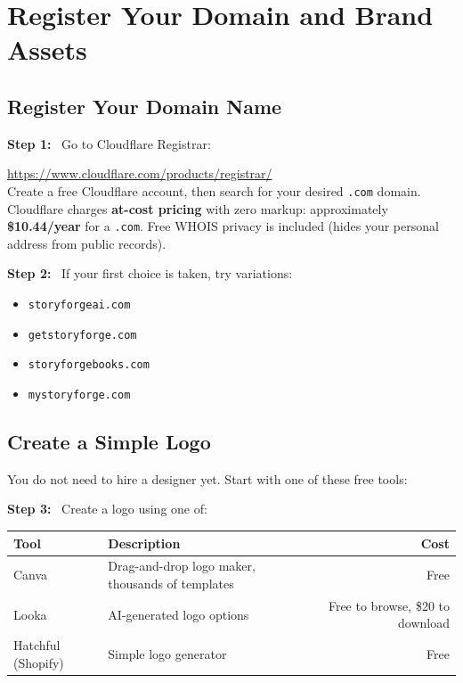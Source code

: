 \documentclass[12pt, letterpaper, oneside]{book}
\newcommand{\cost}[1]{\textcolor{money}{\textbf{#1}}}
\newcommand{\step}[1]{\noindent\textbf{\textcolor{primary}{Step #1:}}~}
\begin{document}
\chapter{Register Your Domain and Brand Assets}

\section{Register Your Domain Name}

\step{1} Go to Cloudflare Registrar:
\begin{actionbox}
\url{https://www.cloudflare.com/products/registrar/}\\[4pt]
Create a free Cloudflare account, then search for your desired \texttt{.com} domain.\\
Cloudflare charges \textbf{at-cost pricing} with zero markup: approximately \cost{\$10.44/year} for a \texttt{.com}. Free WHOIS privacy is included (hides your personal address from public records).
\end{actionbox}

\step{2} If your first choice is taken, try variations:
\begin{itemize}[leftmargin=2em]
  \item \texttt{storyforgeai.com}
  \item \texttt{getstoryforge.com}
  \item \texttt{storyforgebooks.com}
  \item \texttt{mystoryforge.com}
\end{itemize}

\section{Create a Simple Logo}

You do not need to hire a designer yet. Start with one of these free tools:

\step{3} Create a logo using one of:
\begin{table}[H]
\centering
\begin{tabularx}{\textwidth}{lXr}
\toprule
\textbf{Tool} & \textbf{Description} & \textbf{Cost} \\
\midrule
Canva & Drag-and-drop logo maker, thousands of templates & Free \\
Looka & AI-generated logo options & Free to browse, \$20 to download \\
Hatchful (Shopify) & Simple logo generator & Free \\
\bottomrule
\end{tabularx}
\end{table}
\end{document}
